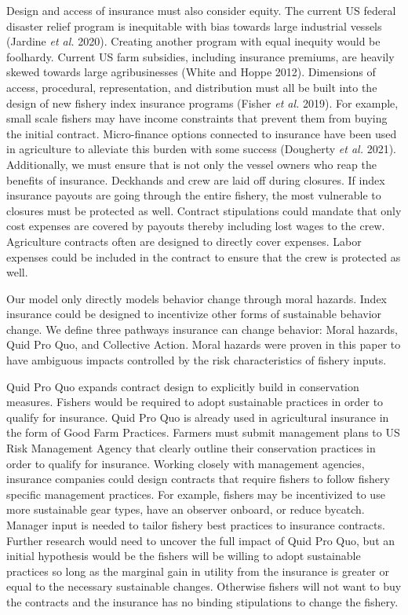 \documentclass[
  letterpaper,
  DIV=11,
  numbers=noendperiod]{scrartcl}
\theoremstyle{plain}
\theoremstyle{plain}
\theoremstyle{remark}
\begin{document}
Design and access of insurance must also consider equity. The current US
federal disaster relief program is inequitable with bias towards large
industrial vessels (Jardine \emph{et al.} 2020). Creating another
program with equal inequity would be foolhardy. Current US farm
subsidies, including insurance premiums, are heavily skewed towards
large agribusinesses (White and Hoppe 2012). Dimensions of access,
procedural, representation, and distribution must all be built into the
design of new fishery index insurance programs (Fisher \emph{et al.}
2019). For example, small scale fishers may have income constraints that
prevent them from buying the initial contract. Micro-finance options
connected to insurance have been used in agriculture to alleviate this
burden with some success (Dougherty \emph{et al.} 2021). Additionally,
we must ensure that is not only the vessel owners who reap the benefits
of insurance. Deckhands and crew are laid off during closures. If index
insurance payouts are going through the entire fishery, the most
vulnerable to closures must be protected as well. Contract stipulations
could mandate that only cost expenses are covered by payouts thereby
including lost wages to the crew. Agriculture contracts often are
designed to directly cover expenses. Labor expenses could be included in
the contract to ensure that the crew is protected as well.

Our model only directly models behavior change through moral hazards.
Index insurance could be designed to incentivize other forms of
sustainable behavior change. We define three pathways insurance can
change behavior: Moral hazards, Quid Pro Quo, and Collective Action.
Moral hazards were proven in this paper to have ambiguous impacts
controlled by the risk characteristics of fishery inputs.

Quid Pro Quo expands contract design to explicitly build in conservation
measures. Fishers would be required to adopt sustainable practices in
order to qualify for insurance. Quid Pro Quo is already used in
agricultural insurance in the form of Good Farm Practices. Farmers must
submit management plans to US Risk Management Agency that clearly
outline their conservation practices in order to qualify for insurance.
Working closely with management agencies, insurance companies could
design contracts that require fishers to follow fishery specific
management practices. For example, fishers may be incentivized to use
more sustainable gear types, have an observer onboard, or reduce
bycatch. Manager input is needed to tailor fishery best practices to
insurance contracts. Further research would need to uncover the full
impact of Quid Pro Quo, but an initial hypothesis would be the fishers
will be willing to adopt sustainable practices so long as the marginal
gain in utility from the insurance is greater or equal to the necessary
sustainable changes. Otherwise fishers will not want to buy the
contracts and the insurance has no binding stipulations to change the
fishery.
\end{document}
